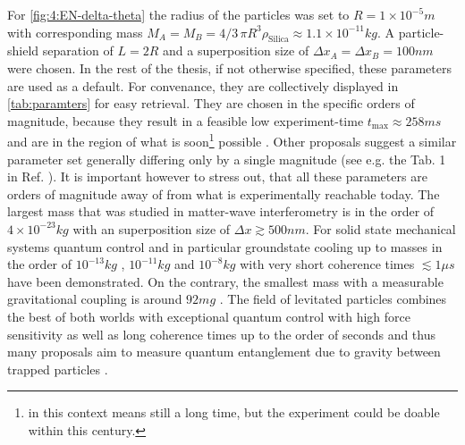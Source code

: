 For \cref{fig:4:EN-delta-theta} the radius of the particles was set to $R=1\times 10^{-5}\si{m}$ with corresponding mass $M_A = M_B = 4/3\, \pi R^3 \rho_\mathrm{Silica} \approx 1.1\times 10^{-11}\si{kg}$.
A particle-shield separation of $L=2R$ and a superposition size of $\Delta x_A = \Delta x_B = 100\si{nm}$ were chosen.
In the rest of the thesis, if not otherwise specified, these parameters are used as a default.
For convenance, they are collectively displayed in \cref{tab:paramters} for easy retrieval.
They are chosen in the specific orders of magnitude, because they result in a feasible low experiment-time $t_\mathrm{max}\approx 258\si{ms}$ and are in the region of what is soon\footnote{ in this context means still a long time, but the experiment could be doable within this century.} possible \cite{Aspelmeyer_2024}.
Other proposals suggest a similar parameter set generally differing only by a single magnitude (see e.g. the Tab. 1 in Ref. \cite{Rijavec_2021}).
It is important however to stress out, that all these parameters are orders of magnitude away of from what is experimentally reachable today.
The largest mass that was studied in matter-wave interferometry is in the order of $4\times 10^{-23}\si{kg}$ \cite{Fein_2019} with an superposition size of $\Delta x \gtrsim 500\si{nm}$.
For solid state mechanical systems quantum control and in particular groundstate cooling up to masses in the order of $10^{-13}\si{kg}$ \cite{OConnell_2010}, $10^{-11}\si{kg}$ \cite{Lee_2011} and $10^{-8}\si{kg}$ \cite{Bild_2023} with very short coherence times $\lesssim 1\si{\mu s}$ have been demonstrated.
On the contrary, the smallest mass with a measurable gravitational coupling is around $92 \si{mg}$ \cite{Westphal_2021}.
The field of levitated particles combines the best of both worlds with exceptional quantum control with high force sensitivity as well as long coherence times up to the order of seconds \cite{Aspelmeyer_2024} and thus many proposals aim to measure quantum entanglement due to gravity between trapped particles \cite{Krisnanda_2020}.

